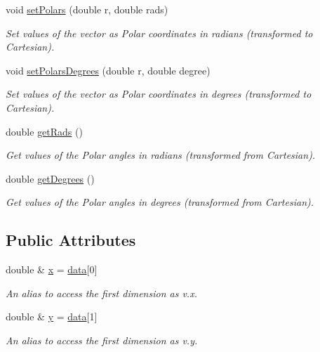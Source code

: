 \begin{DoxyCompactItemize}
void \hyperlink{classzbe_1_1_vector2_d_a652d41922aa9da7820b90ea5439f0457}{set\+Polars} (double r, double rads)
\begin{DoxyCompactList}\small\item\em Set values of the vector as Polar coordinates in radians (transformed to Cartesian). \end{DoxyCompactList}\item 
void \hyperlink{classzbe_1_1_vector2_d_a4d7f72ebfc41063239e63b0b36c156c4}{set\+Polars\+Degrees} (double r, double degree)
\begin{DoxyCompactList}\small\item\em Set values of the vector as Polar coordinates in degrees (transformed to Cartesian). \end{DoxyCompactList}\item 
double \hyperlink{classzbe_1_1_vector2_d_afb4af21a56128d64605b3bc8db0ed7a2}{get\+Rads} ()
\begin{DoxyCompactList}\small\item\em Get values of the Polar angles in radians (transformed from Cartesian). \end{DoxyCompactList}\item 
double \hyperlink{classzbe_1_1_vector2_d_ae39aff1de204d7295e126500d70e6a13}{get\+Degrees} ()
\begin{DoxyCompactList}\small\item\em Get values of the Polar angles in degrees (transformed from Cartesian). \end{DoxyCompactList}\end{DoxyCompactItemize}
\subsection*{Public Attributes}
\begin{DoxyCompactItemize}
\item 
double \& \hyperlink{classzbe_1_1_vector2_d_a66e8c7ff408370756e48e2fd5f211b4e}{x} = \hyperlink{classzbe_1_1_vector_a1adaf8d4244fe2c1d762d6c58f4b01eb}{data}\mbox{[}0\mbox{]}
\begin{DoxyCompactList}\small\item\em An alias to access the first dimension as v.\+x. \end{DoxyCompactList}\item 
double \& \hyperlink{classzbe_1_1_vector2_d_ab36f8d98268760d53da4efb305533cee}{y} = \hyperlink{classzbe_1_1_vector_a1adaf8d4244fe2c1d762d6c58f4b01eb}{data}\mbox{[}1\mbox{]}
\begin{DoxyCompactList}\small\item\em An alias to access the first dimension as v.\+y. \end{DoxyCompactList}\end{DoxyCompactItemize}
